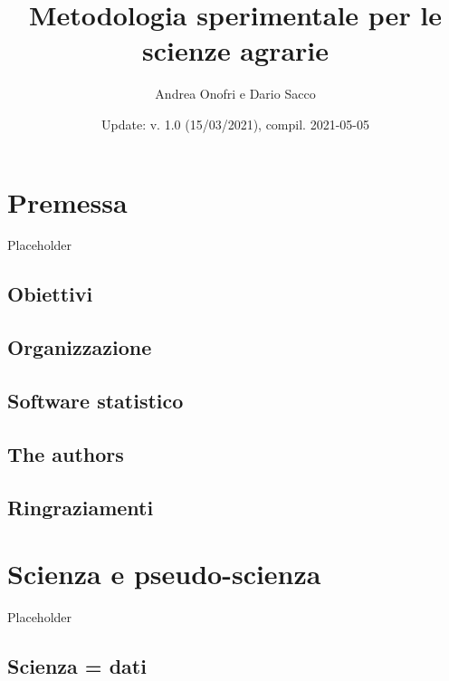 \documentclass[a4paper,12pt,oneside]{book}
\author{Andrea Onofri e Dario Sacco}
\date{Update: v. 1.0 (15/03/2021), compil. 2021-05-05}
\title{Metodologia sperimentale per le scienze agrarie}
\subtitle{}
\begin{document}
\maketitle
\tableofcontents

\hypertarget{premessa}{%
\chapter*{Premessa}\label{premessa}}

Placeholder

\hypertarget{obiettivi}{%
\section*{Obiettivi}\label{obiettivi}}

\hypertarget{organizzazione}{%
\section*{Organizzazione}\label{organizzazione}}

\hypertarget{software-statistico}{%
\section*{Software statistico}\label{software-statistico}}

\hypertarget{the-authors}{%
\section*{The authors}\label{the-authors}}

\hypertarget{ringraziamenti}{%
\section*{Ringraziamenti}\label{ringraziamenti}}

\hypertarget{scienza-e-pseudo-scienza}{%
\chapter{Scienza e pseudo-scienza}\label{scienza-e-pseudo-scienza}}

Placeholder

\hypertarget{scienza-dati}{%
\section{Scienza = dati}\label{scienza-dati}}
\end{document}

